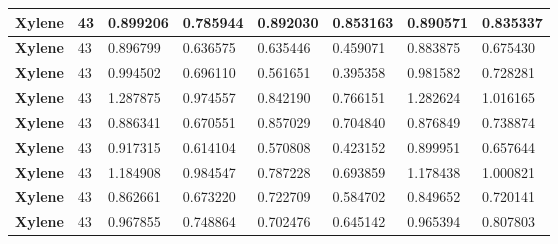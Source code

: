 \documentclass{amsart}
\begin{document}
\begin{center}
\begin{tabular}{|l|l|l|l|l|l|l|l|}
\textbf{Xylene}& 43&0.899206&0.785944&0.892030&0.853163&0.890571&0.835337 \\ \hline 
\textbf{Xylene}& 43&0.896799&0.636575&0.635446&0.459071&0.883875&0.675430 \\ \hline 
\textbf{Xylene}& 43&0.994502&0.696110&0.561651&0.395358&0.981582&0.728281 \\ \hline 
\textbf{Xylene}& 43&1.287875&0.974557&0.842190&0.766151&1.282624&1.016165 \\ \hline 
\textbf{Xylene}& 43&0.886341&0.670551&0.857029&0.704840&0.876849&0.738874 \\ \hline 
\textbf{Xylene}& 43&0.917315&0.614104&0.570808&0.423152&0.899951&0.657644 \\ \hline 
\textbf{Xylene}& 43&1.184908&0.984547&0.787228&0.693859&1.178438&1.000821 \\ \hline 
\textbf{Xylene}& 43&0.862661&0.673220&0.722709&0.584702&0.849652&0.720141 \\ \hline 
\textbf{Xylene}& 43&0.967855&0.748864&0.702476&0.645142&0.965394&0.807803 \\ \hline 
\end{tabular} 
\end{center} 
\end{document}
